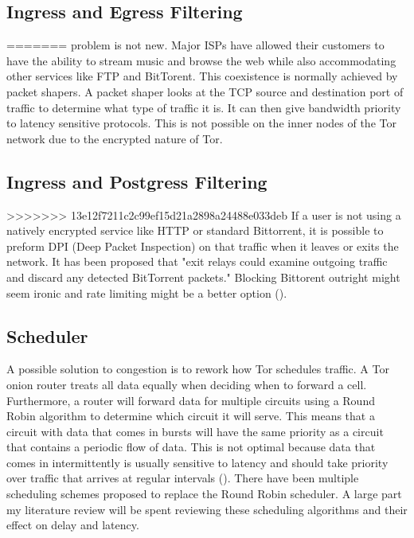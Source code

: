 \documentclass[letterpaper,13pt]{texMemo}
\begin{document}
    \subsection*{Ingress and Egress Filtering}
=======
    problem is not new. Major ISPs have allowed their customers to have the ability to stream music
    and browse the web while also accommodating other services like FTP and BitTorent. This
    coexistence is normally achieved by packet shapers. A packet shaper looks at the TCP source and
    destination port of traffic to determine what type of traffic it is. It can then give
    bandwidth priority to latency sensitive protocols. This is not possible on the inner nodes of
    the Tor network due to the encrypted nature of Tor.

    \subsection*{Ingress and Postgress Filtering}
>>>>>>> 13e12f7211c2c99ef15d21a2898a24488e033deb
    If a user is not using a natively encrypted service like HTTP or standard Bittorrent, it is
    possible to preform DPI (Deep Packet Inspection) on that traffic when it leaves or exits the
    network. It has been proposed that "exit relays could examine outgoing traffic and discard any
    detected BitTorrent packets." Blocking Bittorent outright might seem ironic and rate limiting
    might be a better option (\citeauthor[2]{Moore}).

    \subsection*{Scheduler}
    A possible solution to congestion is to rework how Tor schedules traffic. A Tor onion router
    treats all data equally when deciding when to forward a cell. Furthermore, a router will
    forward data for multiple circuits using a Round Robin algorithm to determine which circuit it
    will serve. This means that a circuit with data that comes in bursts will have the same priority
    as a circuit that contains a periodic flow of data. This is not optimal because data that comes
    in intermittently is usually sensitive to latency and should take priority over traffic that
    arrives at regular intervals (\citeauthor[2]{unfair}). There have been multiple scheduling
    schemes proposed to replace the Round Robin scheduler. A large part my literature review will be
    spent reviewing these scheduling algorithms and their effect on delay and latency.
\end{document}

